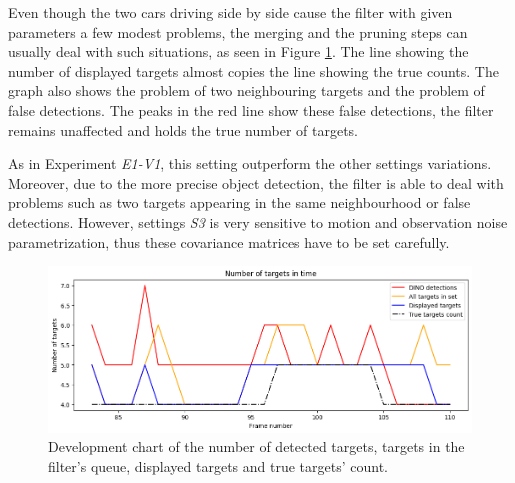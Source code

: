 Even though the two cars driving side by side cause the filter with given parameters a few modest problems, the merging
and
the pruning steps can usually deal with such situations, as seen in Figure \ref{gr:E1-V2-S3}. The line
showing
the number of displayed targets almost copies the line showing the true counts. The graph also shows the problem of
two neighbouring targets and the problem of false detections. The peaks in the red line show these false detections,
the filter remains unaffected and holds the true number of targets.


As in Experiment \textit{E1-V1}, this setting outperform the other settings variations. Moreover, due to the more
precise
object detection, the filter is able to deal with problems such as two targets appearing in the same neighbourhood or
false
detections. However, settings \textit{S3} is very sensitive to motion and observation noise parametrization, thus
these covariance matrices have to be set carefully.

\begin{figure}[H]
    \centering
    \includegraphics[width=\linewidth]{../../../experiments/E1/V2/DINO/dino_det}
    \caption{Development chart of the number of detected targets, targets in the filter's queue, displayed targets and
    true targets' count.}
    \label{gr:E1-V2-S3}
\end{figure}

